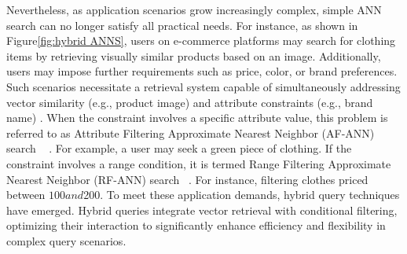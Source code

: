 \documentclass[sigconf, nonacm]{acmart}
\begin{document}
\begin{sloppypar}
Nevertheless, as application scenarios grow increasingly complex, simple ANN search can no longer satisfy all practical needs. For instance, as shown in Figure\ref{fig:hybrid ANNS}, users on e-commerce platforms may search for clothing items by retrieving visually similar products based on an image. Additionally, users may impose further requirements such as price, color, or brand preferences. Such scenarios necessitate a retrieval system capable of simultaneously addressing vector similarity (e.g., product image) and attribute constraints (e.g., brand name) \cite{tian2023approximate}. When the constraint involves a specific attribute value, this problem is referred to as Attribute Filtering Approximate Nearest Neighbor (AF-ANN) search ~\cite{NHQ,Filtered-diskann} . For example, a user may seek a green piece of clothing. If the constraint involves a range condition, it is termed Range Filtering Approximate Nearest Neighbor (RF-ANN) search  ~\cite{serf,iRangeGraph}. For instance, filtering clothes priced between $100 and $200. To meet these application demands, hybrid query \cite{JD-e-commerce, analyticdb} techniques have emerged. Hybrid queries integrate vector retrieval with conditional filtering, optimizing their interaction to significantly enhance efficiency and flexibility in complex query scenarios.





\end{sloppypar}
\end{document}
